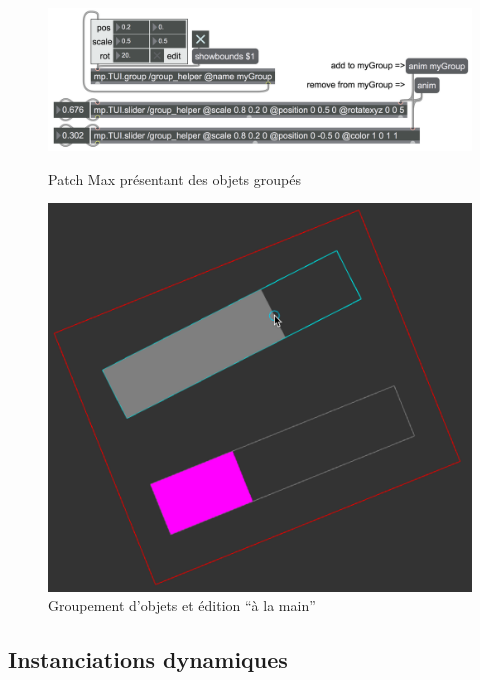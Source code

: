 \begin{figure}[!htbp]
	\captionsetup{format=plain}%
	\centering
	\begin{minipage}[t]{0.48\textwidth}
		\includegraphics[width=\linewidth]{gfx/06_visual_representation/mpTUI_groups_patcher.png}
		\caption{Patch Max présentant des objets groupés}
		\label{fig:visual_representation:groups_patch}
	\end{minipage}
	\hspace{.02\linewidth}
	\begin{minipage}[t]{0.48\textwidth}
	    \includegraphics[width=\linewidth]{gfx/06_visual_representation/mpTUI_groups.png}
		\caption{Groupement d'objets et édition ``à la main''}
		\label{fig:visual_representation:groups}
	\end{minipage}
\end{figure}

\subsection{Instanciations dynamiques}

